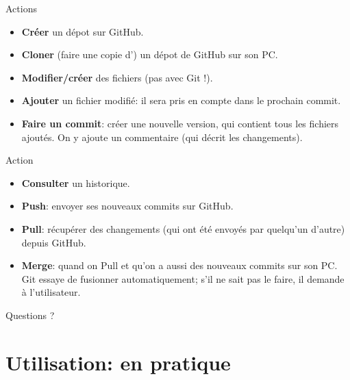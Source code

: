 \documentclass{beamer}
\begin{document}
\begin{frame}{Actions}
    \begin{itemize}
        \item \textbf{Créer} un dépot sur GitHub.
        \item \textbf{Cloner} (faire une copie d') un dépot de GitHub sur son PC.
        \item \textbf{Modifier/créer} des fichiers (pas avec Git !).
        \item \textbf{Ajouter} un fichier modifié: il sera pris en compte dans le
            prochain commit.
        \item \textbf{Faire un commit}: créer une nouvelle version, qui contient tous
            les fichiers ajoutés. On y ajoute un commentaire (qui décrit les
            changements).
    \end{itemize}
\end{frame}
\begin{frame}{Action}
	\begin{itemize}
        \item \textbf{Consulter} un historique.
        \item \textbf{Push}: envoyer ses nouveaux commits sur GitHub.
        \item \textbf{Pull}: récupérer des changements (qui ont été envoyés
            par quelqu'un d'autre) depuis GitHub.
        \item \textbf{Merge}: quand on Pull et qu'on a aussi des nouveaux commits sur
            son PC. Git essaye de fusionner automatiquement; s'il ne sait pas
            le faire, il demande à l'utilisateur.
    \end{itemize}
\end{frame}

\begin{frame}[standout]
    Questions ?
\end{frame}


\section{Utilisation: en pratique}
\end{document}

